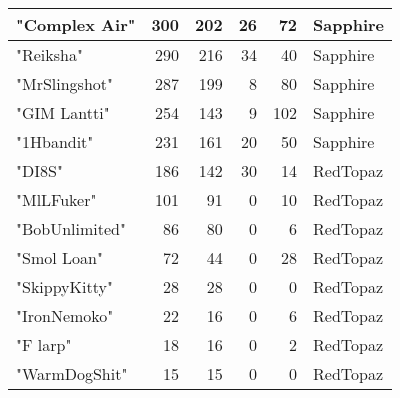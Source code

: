 \documentclass{article}
\begin{document}
\begin{table}[htbp]
\begin{tabular}{|l|r|r|r|r|l|}
"Complex Air" & 300 & 202 & 26 & 72 & Sapphire \\ \hline
"Reiksha" & 290 & 216 & 34 & 40 & Sapphire \\ \hline
"MrSlingshot" & 287 & 199 & 8 & 80 & Sapphire \\ \hline
"GIM Lantti" & 254 & 143 & 9 & 102 & Sapphire \\ \hline
"1Hbandit" & 231 & 161 & 20 & 50 & Sapphire \\ \hline
"DI8S" & 186 & 142 & 30 & 14 & RedTopaz \\ \hline
"MlLFuker" & 101 & 91 & 0 & 10 & RedTopaz \\ \hline
"BobUnlimited" & 86 & 80 & 0 & 6 & RedTopaz \\ \hline
"Smol Loan" & 72 & 44 & 0 & 28 & RedTopaz \\ \hline
"SkippyKitty" & 28 & 28 & 0 & 0 & RedTopaz \\ \hline
"IronNemoko" & 22 & 16 & 0 & 6 & RedTopaz \\ \hline
"F larp" & 18 & 16 & 0 & 2 & RedTopaz \\ \hline
"WarmDogShit" & 15 & 15 & 0 & 0 & RedTopaz \\ \hline
\end{tabular}
\end{table}
\end{document}
